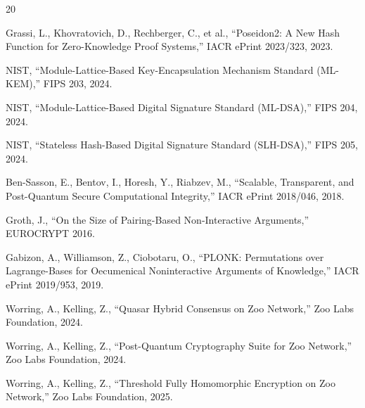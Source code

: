 \documentclass[11pt,a4paper]{article}
\begin{document}
\begin{thebibliography}{20}

Grassi, L., Khovratovich, D., Rechberger, C., et al., ``Poseidon2: A New Hash Function for Zero-Knowledge Proof Systems,'' IACR ePrint 2023/323, 2023.

NIST, ``Module-Lattice-Based Key-Encapsulation Mechanism Standard (ML-KEM),'' FIPS 203, 2024.

NIST, ``Module-Lattice-Based Digital Signature Standard (ML-DSA),'' FIPS 204, 2024.

NIST, ``Stateless Hash-Based Digital Signature Standard (SLH-DSA),'' FIPS 205, 2024.

Ben-Sasson, E., Bentov, I., Horesh, Y., Riabzev, M., ``Scalable, Transparent, and Post-Quantum Secure Computational Integrity,'' IACR ePrint 2018/046, 2018.

Groth, J., ``On the Size of Pairing-Based Non-Interactive Arguments,'' EUROCRYPT 2016.

Gabizon, A., Williamson, Z., Ciobotaru, O., ``PLONK: Permutations over Lagrange-Bases for Oecumenical Noninteractive Arguments of Knowledge,'' IACR ePrint 2019/953, 2019.

Worring, A., Kelling, Z., ``Quasar Hybrid Consensus on Zoo Network,'' Zoo Labs Foundation, 2024.

Worring, A., Kelling, Z., ``Post-Quantum Cryptography Suite for Zoo Network,'' Zoo Labs Foundation, 2024.

Worring, A., Kelling, Z., ``Threshold Fully Homomorphic Encryption on Zoo Network,'' Zoo Labs Foundation, 2025.

\end{thebibliography}
\end{document}
